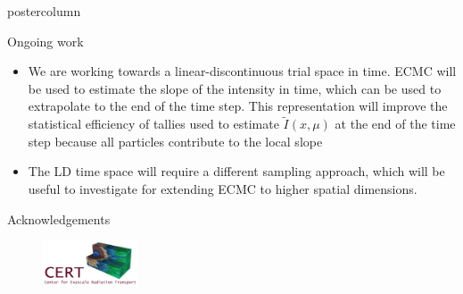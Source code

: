\documentclass[xcolor=dvipsnames]{beamer}
\newcommand{\colb}[1]{{\color{blue} #1}}
\begin{document}
\begin{frame}
\begin{columns}
\begin{column}{.49\textwidth}
\begin{beamercolorbox}[center,wd=\textwidth]{postercolumn}
\begin{minipage}[T]{0.95\textwidth}
{    %
     \vfill
    \begin{block}{Ongoing work}
    \begin{itemize}
        \setlength\itemsep{0.25em}
        \item We are working towards a \colb{linear-discontinuous} trial space in time.  ECMC will be used to estimate
              the slope of the intensity in time, which can be used to extrapolate to the end of the time step.  This  
              representation will improve the statistical efficiency of tallies used to estimate $\tilde I(x,\mu)$ at 
              the end of the time step because all particles contribute to the local slope
        \item The LD time space will require a different sampling approach, which will be useful to investigate for extending
              ECMC to higher spatial dimensions.
        \end{itemize}
    \end{block}
     \vfill
    \begin{block}{Acknowledgements}
        \begin{figure}
            \centering
            \includegraphics[width=0.25\textwidth]{cert_logo_maroon.png}
     \end{figure}
    \end{block}
}
\end{minipage}
\end{beamercolorbox}
\end{column}

\end{columns}
\end{frame}
\end{document}

